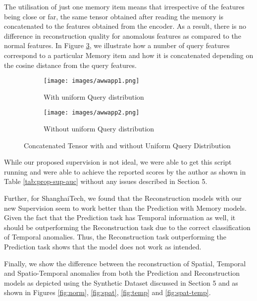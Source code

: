 The utilisation of just one memory item means that irrespective of the features being close or far, the same tensor obtained after reading the memory is concatenated to the features obtained from the encoder. As a result, there is no difference in reconstruction quality for anomalous features as compared to the normal features. In Figure \ref{fig:Concatenated Tensor with and without Uniform Query Distribution}, we illustrate how a number of query features correspond to a particular Memory item and how it is concatenated depending on the cosine distance from the query features. 
\begin{figure}[h]
     \centering
     \begin{subfigure}[b]{0.4\textwidth}
         \centering
         \texttt{[image: images/awwapp1.png]}
         \caption{With uniform Query distribution}
         \label{fig:uniform}
     \end{subfigure}
     \hfill
     \begin{subfigure}[b]{0.4\textwidth}
         \centering
         \texttt{[image: images/awwapp2.png]}
         \caption{Without uniform Query distribution}
         \label{fig:lopsided}
     \end{subfigure}
        \caption{Concatenated Tensor with and without Uniform Query Distribution}
        \label{fig:Concatenated Tensor with and without Uniform Query Distribution}
\end{figure}

While our proposed supervision is not ideal, we were able to get this script running and were able to achieve the reported scores by the author as shown in Table \ref{tab:prop-sup-auc} without any issues described in Section 5. 

Further, for ShanghaiTech\cite{Luo2017ARO}, we found that the Reconstruction models with our new Supervision seem to work better than the Prediction with Memory models. Given the fact that the Prediction task has Temporal information as well, it should be outperforming the Reconstruction task due to the correct classification of Temporal anomalies. Thus, the Reconstruction task outperforming the Prediction task shows that the model does not work as intended.

Finally, we show the difference between the reconstruction of Spatial, Temporal and Spatio-Temporal anomalies from both the Prediction and Reconstruction models as depicted using the Synthetic Dataset discussed in Section 5 and as shown in Figures \ref{fig:norm}, \ref{fig:spat}, \ref{fig:temp} and \ref{fig:spat-temp}.


